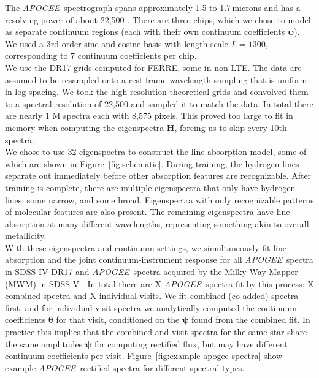 \documentclass[modern]{aastex631}
\newcommand{\project}[1]{\textit{#1}}
\newcommand{\vectheta}{\boldsymbol{\theta}}
\newcommand{\vecpsi}{\boldsymbol{\psi}}
\newcommand{\vecH}{\mathbf{H}}
\newcommand{\apogee}{\project{APOGEE}}
\newcommand{\todo}[1]{\textcolor{tab:blue}{#1}}
\begin{document}
The \apogee\ spectrograph spans approximately 1.5 to 1.7\,microns and has a resolving power of about 22,500 \citep{wilson}. There are three chips, which we chose to model as separate continuum regions (each with their own continuum coefficients $\vecpsi$). We used a 3rd order sine-and-cosine basis with length scale $L = 1300$, corresponding to 7 continuum coefficients per chip.\\

We use the \todo{DR17 grids computed for FERRE, some in non-LTE}. The data are assumed to be resampled onto a rest-frame wavelength sampling that is uniform in log-spacing. We took the high-resolution theoretical grids and convolved them to a spectral resolution of 22,500 and sampled it to match the data. In total there are nearly \todo{1 M} spectra each with 8,575 pixels. This proved too large to fit in memory when computing the eigenspectra $\vecH$, forcing us to skip every 10th spectra.\\

We chose to use 32 eigenspectra to construct the line absorption model, some of which are shown in Figure~\ref{fig:schematic}. During training, the hydrogen lines separate out immediately before other absorption features are recognizable. After training is complete, there are multiple eigenspectra that only have hydrogen lines: some narrow, and some broad. Eigenspectra with only recognizable patterns of molecular features are also present. The remaining eigenspectra have line absorption at many different wavelengths, representing something akin to overall metallicity. \\

With these eigenspectra and continuum settings, we simultaneously fit line absorption and the joint continuum-instrument response for all \apogee\ spectra in SDSS-IV DR17 \citep{dr17} and \apogee\ spectra acquired by the Milky Way Mapper (MWM) in SDSS-V \citep{kollmeier}. In total there are \todo{X} \apogee\ spectra fit by this process: \todo{X} combined spectra and \todo{X} individual visits. We fit combined (co-added) spectra first, and for individual visit spectra we analytically computed the continuum coefficients $\vectheta$ for that visit, conditioned on the $\vecpsi$ found from the combined fit. In practice this implies that the combined and visit spectra for the same star share the same amplitudes $\vecpsi$ for computing rectified flux, but may have different continuum coefficients per visit. Figure~\ref{fig:example-apogee-spectra} show example \apogee\ rectified spectra for different spectral types. 
\end{document}
